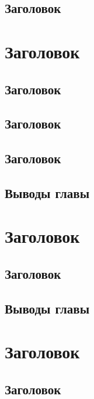 \documentclass[openany]{book}
\theoremstyle{definition}
\begin{document}
\section{Заголовок}


\chapter{Заголовок}
\pagestyle{fancy}
\section{Заголовок}

\section{Заголовок}


\section{Заголовок}


\section{Выводы главы}


\chapter{Заголовок}
\pagestyle{fancy}


\section{Заголовок}






\section{Выводы главы}



\chapter{Заголовок}
\pagestyle{fancy}

\section{Заголовок}
\end{document}
